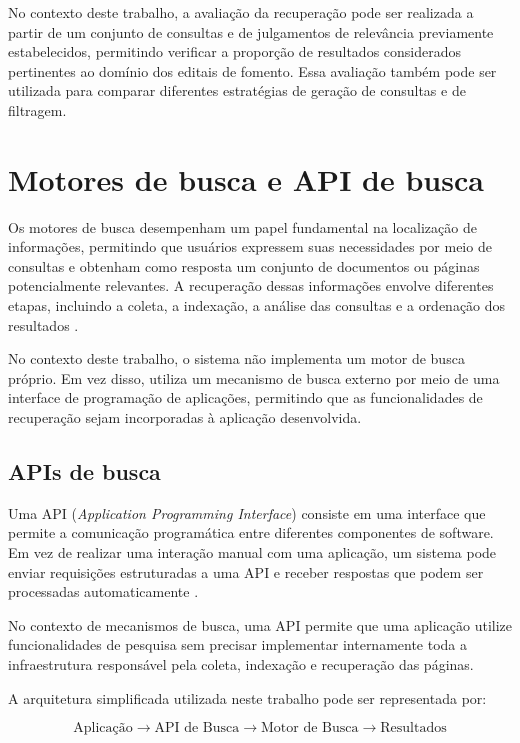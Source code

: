 No contexto deste trabalho, a avaliação da recuperação pode ser realizada a partir de um conjunto de consultas e de julgamentos de relevância previamente estabelecidos, permitindo verificar a proporção de resultados considerados pertinentes ao domínio dos editais de fomento. Essa avaliação também pode ser utilizada para comparar diferentes estratégias de geração de consultas e de filtragem.

\section{Motores de busca e API de busca}

Os motores de busca desempenham um papel fundamental na localização de informações, permitindo que usuários expressem suas necessidades por meio de consultas e obtenham como resposta um conjunto de documentos ou páginas potencialmente relevantes. A recuperação dessas informações envolve diferentes etapas, incluindo a coleta, a indexação, a análise das consultas e a ordenação dos resultados \cite{baeza2011}.

No contexto deste trabalho, o sistema não implementa um motor de busca próprio. Em vez disso, utiliza um mecanismo de busca externo por meio de uma interface de programação de aplicações, permitindo que as funcionalidades de recuperação sejam incorporadas à aplicação desenvolvida.

\subsection{APIs de busca}

Uma API (\textit{Application Programming Interface}) consiste em uma interface que permite a comunicação programática entre diferentes componentes de software. Em vez de realizar uma interação manual com uma aplicação, um sistema pode enviar requisições estruturadas a uma API e receber respostas que podem ser processadas automaticamente \cite{jacobson2011}.

No contexto de mecanismos de busca, uma API permite que uma aplicação utilize funcionalidades de pesquisa sem precisar implementar internamente toda a infraestrutura responsável pela coleta, indexação e recuperação das páginas.

A arquitetura simplificada utilizada neste trabalho pode ser representada por:

\begin{equation}
\text{Aplicação}
\rightarrow
\text{API de Busca}
\rightarrow
\text{Motor de Busca}
\rightarrow
\text{Resultados}
\end{equation}

